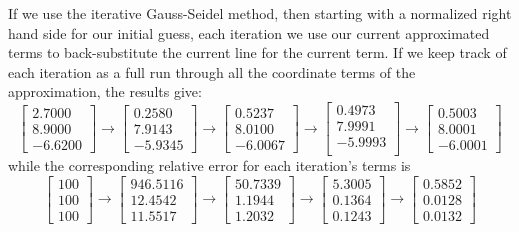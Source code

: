 \documentclass{article}
\begin{document}
\begin{solution}
If we use the iterative Gauss-Seidel method, then starting with a normalized right hand side for our initial guess, each iteration we use our current approximated terms to back-substitute the current line for the current term. If we keep track of each iteration as a full run through all the coordinate terms of the approximation, the results give:
\[
\begin{bmatrix}
2.7000\\
8.9000\\
-6.6200
\end{bmatrix}
\to
\begin{bmatrix}
0.2580\\
7.9143\\
-5.9345
\end{bmatrix}
\to
\begin{bmatrix}
0.5237\\
8.0100\\
-6.0067
\end{bmatrix}
\to
\begin{bmatrix}
0.4973\\
7.9991\\
-5.9993\\
\end{bmatrix}
\to
\begin{bmatrix}
0.5003\\
8.0001\\
-6.0001
\end{bmatrix}
\]
while the corresponding relative error for each iteration's terms is
\[
\begin{bmatrix}
100\\
100\\
100
\end{bmatrix}
\to
\begin{bmatrix}
946.5116\\
12.4542\\
11.5517
\end{bmatrix}
\to
\begin{bmatrix}
50.7339\\
1.1944\\
1.2032
\end{bmatrix}
\to
\begin{bmatrix}
5.3005\\
0.1364\\
0.1243
\end{bmatrix}
\to
\begin{bmatrix}
0.5852\\
0.0128\\
0.0132
\end{bmatrix}
\]
\end{solution}
\end{document}
